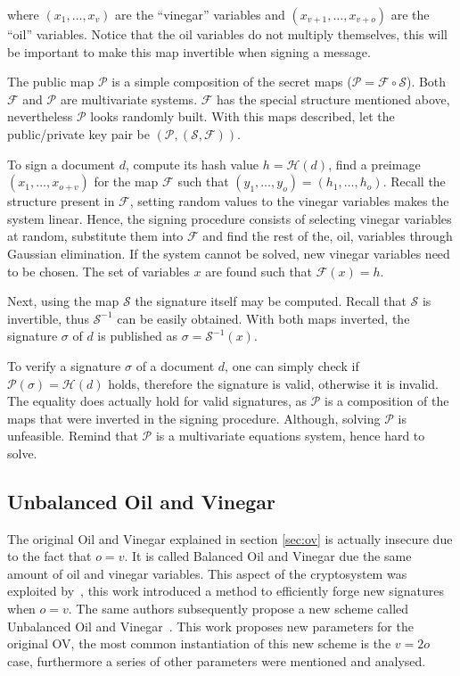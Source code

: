 \documentclass{ufsctex/ufsctex}
\begin{document}
where $(x_1,\dots,x_v)$ are the ``vinegar'' variables and
$(x_{v+1},\dots,x_{v+o})$ are the ``oil'' variables. Notice that the oil
variables do not multiply themselves, this will be important to make this map
invertible when signing a message.

The public map $\mathcal{P}$ is a simple composition of the secret maps
($\mathcal{P} = \mathcal{F} \circ \mathcal{S}$). Both $\mathcal{F}$ and
$\mathcal{P}$ are multivariate systems. $\mathcal{F}$ has the special structure
mentioned above, nevertheless $\mathcal{P}$ looks randomly built. With this
maps described, let the public/private key pair be
$(\mathcal{P},(\mathcal{S},\mathcal{F}))$.

To sign a document $d$, compute its hash value $h = \mathcal{H}(d)$, find a
preimage $(x_1,\dots,x_{o+v})$ for the map $\mathcal{F}$ such that
$(y_1,\dots,y_o) = (h_1,\dots,h_o)$. Recall the structure present in
$\mathcal{F}$, setting random values to the vinegar variables makes the system
linear. Hence, the signing procedure consists of selecting vinegar variables at
random, substitute them into $\mathcal{F}$ and find the rest of the, oil,
variables through Gaussian elimination. If the system cannot be solved, new
vinegar variables need to be chosen. The set of variables $x$ are found such
that $\mathcal{F}(x)=h$.

Next, using the map $\mathcal{S}$ the signature itself may be computed. Recall
that $\mathcal{S}$ is invertible, thus $\mathcal{S}^{-1}$ can be easily
obtained. With both maps inverted, the signature $\sigma$ of $d$ is published
as $\sigma = \mathcal{S}^{-1}(x)$.

To verify a signature $\sigma$ of a document $d$, one can simply check if
$\mathcal{P}(\sigma) = \mathcal{H}(d)$ holds, therefore the signature is valid,
otherwise it is invalid. The equality does actually hold for valid signatures,
as $\mathcal{P}$ is a composition of the maps that were inverted in the signing
procedure. Although, solving $\mathcal{P}$ is unfeasible. Remind that
$\mathcal{P}$ is a multivariate equations system, hence hard to solve.

\subsection{Unbalanced Oil and Vinegar}

The original Oil and Vinegar explained in section \ref{sec:ov} is actually
insecure due to the fact that $o = v$. It is called Balanced Oil and Vinegar
due the same amount of oil and vinegar variables. This aspect of the
cryptosystem was exploited by~\cite{kipnis1998cryptanalysis}, this work
introduced a method to efficiently forge new signatures when $o = v$. The same
authors subsequently propose a new scheme called Unbalanced Oil and
Vinegar~\cite{kipnis1999unbalanced}. This work proposes new parameters for the
original OV, the most common instantiation of this
new scheme is the $v = 2o$ case, furthermore a series of other parameters were
mentioned and analysed.
\end{document}
